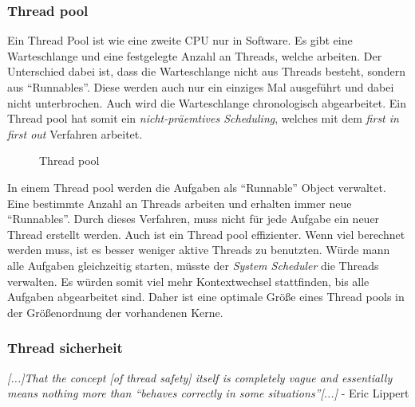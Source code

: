 \subsubsection{Thread pool}
Ein Thread Pool ist wie eine zweite CPU nur in Software. Es gibt eine Warteschlange und eine festgelegte Anzahl an Threads, welche arbeiten. Der Unterschied dabei ist, dass die Warteschlange nicht aus Threads besteht, sondern aus ``Runnables''. Diese werden auch nur ein einziges Mal ausgeführt und dabei nicht unterbrochen. Auch wird die Warteschlange chronologisch abgearbeitet. Ein Thread pool hat somit ein \textit{nicht-präemtives Scheduling}, welches mit dem \textit{first in first out} Verfahren arbeitet.\newpage
\begin{figure}[h]
    
    \caption{Thread pool\protect\footnotemark}
    \label{Thread Pool}
\end{figure}
In einem Thread pool werden die Aufgaben als ``Runnable'' Object verwaltet. Eine bestimmte Anzahl an Threads arbeiten und erhalten immer neue ``Runnables''. Durch dieses Verfahren, muss nicht für jede Aufgabe ein neuer Thread erstellt werden. Auch ist ein Thread pool effizienter. Wenn viel berechnet werden muss, ist es besser weniger aktive Threads zu benutzten. Würde mann alle Aufgaben gleichzeitig starten, müsste der \textit{System Scheduler} die Threads verwalten. Es würden somit viel mehr Kontextwechsel stattfinden, bis alle Aufgaben abgearbeitet sind. Daher ist eine optimale Größe eines Thread pools in der Größenordnung der vorhandenen Kerne.\cite{ThreadPool:Java}

\subsubsection{Thread sicherheit}
\begin{center}
    \textit{
        [...]That the concept [of thread safety] itself is completely vague and essentially means nothing more than ``behaves correctly in some situations''[...]
    } - Eric Lippert \cite{Threads:Lippert}
\end{center}

